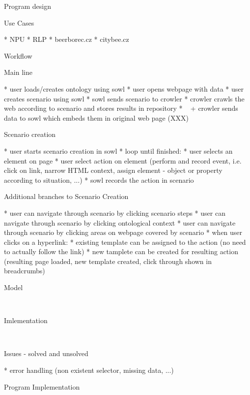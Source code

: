 \chap Program design


\sec Use Cases

\begitems
  * NPU
  * RLP
  * beerborec.cz
  * citybee.cz
\enditems



\sec Workflow

\secc Main line

\begitems
  * user loads/creates ontology using sowl
  * user opens webpage with data
  * user creates scenario using sowl
  * sowl sends scenario to crowler
  * crowler crawls the web according to scenario and stores results in repository
  * ~ + crowler sends data to sowl which embeds them in original web page (XXX)
\enditems


\secc Scenario creation

\begitems
  * user starts scenario creation in sowl
  * loop until finished:
  \begitems
    * user selects an element on page
    * user select action on element (perform and record event, i.e. click on link, narrow HTML context, assign element - object or property according to situation, ...)
    * sowl records the action in scenario
  \enditems
\enditems


\secc Additional branches to Scenario Creation

\begitems
  * user can navigate through scenario by clicking scenario steps
  * user can navigate through scenario by clicking ontological context
  * user can navigate through scenario by clicking areas on webpage covered by scenario
  * when user clicks on a hyperlink: 
  \begitems
    * existing template can be assigned to the action (no need to actually follow the link)
    * new tamplete can be created for resulting action (resulting page loaded, new template created, click through shown in breadcrumbs)
  \enditems
\enditems



\sec Model

~


\sec Imlementation

~


\sec Issues - solved and unsolved

\begitems
  * error handling (non existent selector, missing data, ...)
\enditems





\chap Program Implementation
~







